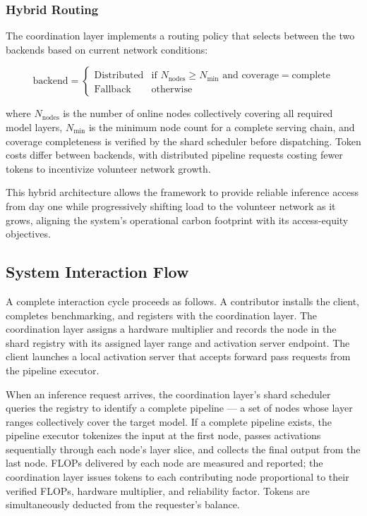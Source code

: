 \documentclass[12pt]{article}
\begin{document}
\subsubsection{Hybrid Routing}

The coordination layer implements a routing policy that selects between the two backends based on current network conditions:

\begin{equation}
\text{backend} =
\begin{cases}
\text{Distributed} & \text{if } N_{\text{nodes}} \geq N_{\text{min}} \text{ and } \text{coverage} = \text{complete} \\
\text{Fallback} & \text{otherwise}
\end{cases}
\label{eq:routing}
\end{equation}

where $N_{\text{nodes}}$ is the number of online nodes collectively covering all required model layers, $N_{\text{min}}$ is the minimum node count for a complete serving chain, and coverage completeness is verified by the shard scheduler before dispatching. Token costs differ between backends, with distributed pipeline requests costing fewer tokens to incentivize volunteer network growth.

This hybrid architecture allows the framework to provide reliable inference access from day one while progressively shifting load to the volunteer network as it grows, aligning the system's operational carbon footprint with its access-equity objectives.

\subsection{System Interaction Flow}

A complete interaction cycle proceeds as follows. A contributor installs the client, completes benchmarking, and registers with the coordination layer. The coordination layer assigns a hardware multiplier and records the node in the shard registry with its assigned layer range and activation server endpoint. The client launches a local activation server that accepts forward pass requests from the pipeline executor.

When an inference request arrives, the coordination layer's shard scheduler queries the registry to identify a complete pipeline — a set of nodes whose layer ranges collectively cover the target model. If a complete pipeline exists, the pipeline executor tokenizes the input at the first node, passes activations sequentially through each node's layer slice, and collects the final output from the last node. FLOPs delivered by each node are measured and reported; the coordination layer issues tokens to each contributing node proportional to their verified FLOPs, hardware multiplier, and reliability factor. Tokens are simultaneously deducted from the requester's balance.
\end{document}
